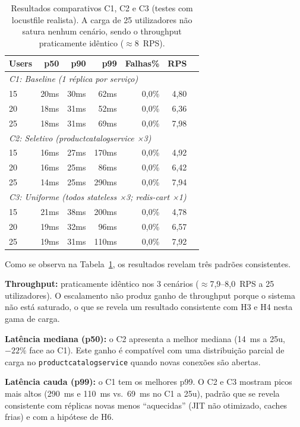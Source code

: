 \documentclass[manuscript,oneside]{acmart}
\begin{document}
\begin{table}[H]
\caption{Resultados comparativos C1, C2 e C3 (testes com locustfile realista). A carga de 25 utilizadores não satura nenhum cenário, sendo o throughput praticamente idêntico ($\approx$8~RPS).}
\label{tab:comparativos}
\begin{tabular}{lrrrrrr}
\toprule
\textbf{Users} & \textbf{p50} & \textbf{p90} & \textbf{p99} & \textbf{Falhas\%} & \textbf{RPS} \\
\midrule
\multicolumn{6}{l}{\textit{C1: Baseline (1 réplica por serviço)}} \\
15 & 20ms & 30ms & 62ms & 0,0\% & 4,80 \\
20 & 18ms & 31ms & 52ms & 0,0\% & 6,36 \\
25 & 18ms & 31ms & 69ms & 0,0\% & 7,98 \\
\midrule
\multicolumn{6}{l}{\textit{C2: Seletivo (productcatalogservice ×3)}} \\
15 & 16ms & 27ms & 170ms & 0,0\% & 4,92 \\
20 & 16ms & 25ms & 86ms & 0,0\% & 6,42 \\
25 & 14ms & 25ms & 290ms & 0,0\% & 7,94 \\
\midrule
\multicolumn{6}{l}{\textit{C3: Uniforme (todos stateless ×3; redis-cart ×1)}} \\
15 & 21ms & 38ms & 200ms & 0,0\% & 4,78 \\
20 & 19ms & 32ms & 96ms & 0,0\% & 6,57 \\
25 & 19ms & 31ms & 110ms & 0,0\% & 7,92 \\
\bottomrule
\end{tabular}
\end{table}

Como se observa na Tabela~\ref{tab:comparativos}, os resultados revelam três padrões consistentes.

\textbf{Throughput:} praticamente idêntico nos 3 cenários ($\approx$7,9--8,0~RPS a 25 utilizadores). O escalamento não produz ganho de throughput porque o sistema não está saturado, o que se revela um resultado consistente com H3 e H4 nesta gama de carga.

\textbf{Latência mediana (p50):} o C2 apresenta a melhor mediana (14~ms a 25u, $-22\%$ face ao C1). Este ganho é compatível com uma distribuição parcial de carga no \texttt{productcatalogservice} quando novas conexões são abertas.

\textbf{Latência cauda (p99):} o C1 tem os melhores p99. O C2 e C3 mostram picos mais altos (290~ms e 110~ms vs.\ 69~ms no C1 a 25u), padrão que se revela consistente com réplicas novas menos ``aquecidas'' (JIT não otimizado, caches frias) e com a hipótese de H6.
\end{document}
